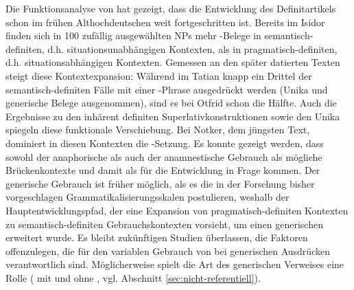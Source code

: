 Die Funktionsanalyse von  hat gezeigt, dass die Entwicklung des Definitartikels schon im frühen Althochdeutschen weit fortgeschritten ist. Bereits im Isidor finden sich in 100 zufällig ausgewählten NPs mehr -Belege in semantisch-definiten, d.h. situationsunabhängigen Kontexten, als in pragmatisch-definiten, d.h. situationsabhängigen Kontexten. Gemessen an den später datierten Texten steigt diese Kontextexpansion: Während im Tatian knapp ein Drittel der semantisch-definiten Fälle mit einer -Phrase ausgedrückt werden (Unika und generische Belege ausgenommen), sind es bei Otfrid schon die Hälfte. Auch die Ergebnisse zu den inhärent definiten Superlativkonstruktionen sowie den Unika spiegeln diese funktionale Verschiebung. Bei Notker, dem jüngsten Text, dominiert in diesen Kontexten die -Setzung. Es konnte gezeigt werden, dass sowohl der anaphorische als auch der anamnestische Gebrauch als mögliche Brückenkontexte und damit als  für die Entwicklung in Frage kommen. Der generische Gebrauch ist früher möglich, als es die in der Forschung bisher vorgeschlagen Grammatikalisierungsskalen postulieren, weshalb der Hauptentwicklungspfad, der eine Expansion von pragmatisch-definiten Kontexten zu semantisch-definiten Gebrauchskontexten vorsieht, um einen generischen  erweitert wurde. Es bleibt zukünftigen Studien überlassen, die Faktoren offenzulegen, die für den variablen Gebrauch von  bei generischen Ausdrücken verantwortlich sind. Möglicherweise spielt die Art des generischen Verweises eine Rolle ( mit und ohne , vgl. Abschnitt \ref{sec:nicht-referentiell}). 

